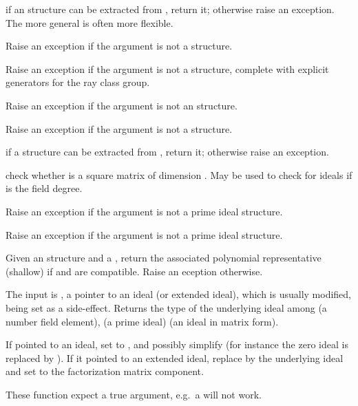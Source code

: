  if an  structure can be extracted from
, return it; otherwise raise an exception. The more general
 is often more flexible.

 Raise an exception if the argument
is not a  structure.

 Raise an exception if the argument is not a
 structure, complete with explicit generators for the ray class group.

 Raise an exception if the argument is not an
 structure.

 Raise an exception if the argument is not a
 structure.

 if a  structure can be extracted
from , return it; otherwise raise an exception.

 check whether  is a square matrix
of dimension . May be used to check for ideals if  is the field
degree.

 Raise an exception if the argument is not a
prime ideal structure.

 Raise an exception if the argument is not a
 prime ideal structure.

 Given an  structure
 and a  , return the associated polynomial
representative (shallow) if  and  are compatible. Raise an
eception otherwise.

 The input is , a pointer
to an ideal (or extended ideal), which is usually modified,  being
set as a side-effect. Returns the type of the underlying ideal among
 (a number field element),  (a prime ideal)
 (an ideal in matrix form).

If  pointed to an ideal, set  to , and
possibly simplify  (for instance the zero ideal is replaced by
). If it pointed to an extended ideal, replace
 by the underlying ideal and set  to the factorization
matrix component.


These function expect a true  argument, e.g.~a  will not
work.

